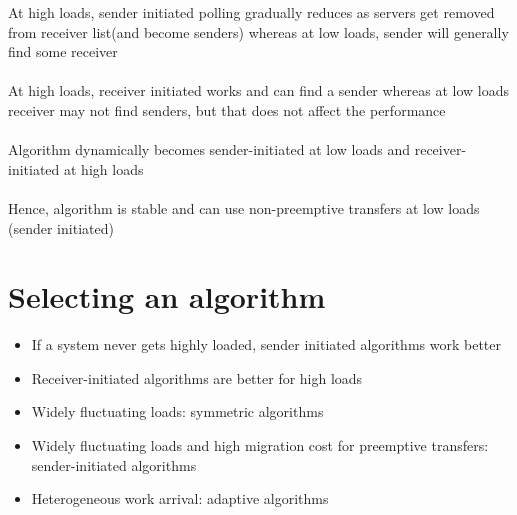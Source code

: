 \documentclass{article}[18pt]
\begin{document}
At high loads, sender initiated polling gradually reduces as servers get removed from receiver list(and become senders) whereas at low loads, sender will generally find some receiver\\
\\
At high loads, receiver initiated works and can find a sender whereas at low loads receiver may not find senders, but that does not affect the performance\\
\\
Algorithm dynamically becomes sender-initiated at low loads and receiver-initiated at high loads\\
\\
Hence, algorithm is stable and can use non-preemptive transfers at low loads (sender initiated)
\section{Selecting an algorithm}
\begin{itemize}
	\item If a system never gets highly loaded, sender initiated algorithms work better
	\item Receiver-initiated algorithms are better for high loads
	\item Widely fluctuating loads: symmetric algorithms
	\item Widely fluctuating loads and high migration cost for preemptive transfers: sender-initiated algorithms
	\item Heterogeneous work arrival: adaptive algorithms
\end{itemize}
\end{document}
